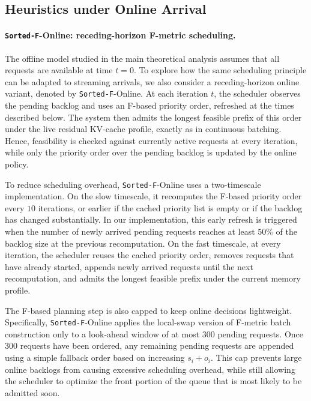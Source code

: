 \documentclass[nonblindrev]{informs3_hide}
\newcommand{\sortF}{\texttt{Sorted-F}}
\begin{document}
\subsection{Heuristics under Online Arrival}

\paragraph{\sortF{}-Online: receding-horizon F-metric scheduling.}
The offline model studied in the main theoretical analysis assumes that all requests are available at time $t=0$. To explore how the same scheduling principle can be adapted to streaming arrivals, we also consider a receding-horizon online variant, denoted by \sortF{}-Online. At each iteration $t$, the scheduler observes the pending backlog and uses an F-based priority order, refreshed at the times described below. The system then admits the longest feasible prefix of this order under the live residual KV-cache profile, exactly as in continuous batching. Hence, feasibility is checked against currently active requests at every iteration, while only the priority order over the pending backlog is updated by the online policy.

To reduce scheduling overhead, \sortF{}-Online uses a two-timescale implementation. On the slow timescale, it recomputes the F-based priority order every $10$ iterations, or earlier if the cached priority list is empty or if the backlog has changed substantially. In our implementation, this early refresh is triggered when the number of newly arrived pending requests reaches at least $50\%$ of the backlog size at the previous recomputation. On the fast timescale, at every iteration, the scheduler reuses the cached priority order, removes requests that have already started, appends newly arrived requests until the next recomputation, and admits the longest feasible prefix under the current memory profile.

The F-based planning step is also capped to keep online decisions lightweight. Specifically, \sortF{}-Online applies the local-swap version of F-metric batch construction only to a look-ahead window of at most $300$ pending requests. Once $300$ requests have been ordered, any remaining pending requests are appended using a simple fallback order based on increasing $s_i+o_i$. This cap prevents large online backlogs from causing excessive scheduling overhead, while still allowing the scheduler to optimize the front portion of the queue that is most likely to be admitted soon.
\end{document}
